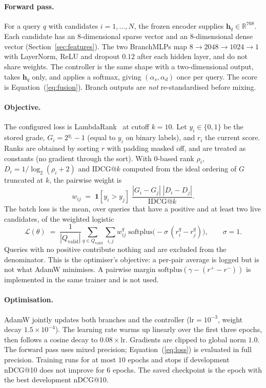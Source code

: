\paragraph{Forward pass.}
For a query $q$ with candidates $i=1,\ldots,N$, the frozen encoder supplies
$\mathbf{h}_q\in\mathbb{R}^{768}$. Each candidate has an $8$-dimensional sparse
vector and an $8$-dimensional dense vector (Section~\ref{sec:features}). The
two BranchMLPs map $8\to 2048\to 1024\to 1$ with LayerNorm, ReLU and dropout
$0.12$ after each hidden layer, and do not share weights. The controller is
the same shape with a two-dimensional output, takes $\mathbf{h}_q$ only, and
applies a softmax, giving $(\alpha_s,\alpha_d)$ once per query. The score is
Equation~(\ref{eq:fusion}). Branch outputs are \emph{not} re-standardised
before mixing.

\paragraph{Objective.}
The configured loss is LambdaRank~\cite{burges2010ranknet} at cutoff
$k{=}10$. Let $y_i\in\{0,1\}$ be the stored grade, $G_i=2^{y_i}-1$ (equal to
$y_i$ on binary labels), and $r_i$ the current score. Ranks are obtained by
sorting $r$ with padding masked off, and are treated as constants
(no gradient through the sort). With $0$-based rank $\rho_i$,
$D_i=1/\log_2(\rho_i+2)$ and $\mathrm{IDCG}@k$ computed from the ideal
ordering of $G$ truncated at $k$, the pairwise weight is
%
\begin{equation}
  w_{ij}
  \;=\;
  \mathbf{1}[y_i > y_j]\;
  \frac{|G_i-G_j|\;|D_i-D_j|}{\mathrm{IDCG}@k}.
  \label{eq:lambdarank-w}
\end{equation}
%
The batch loss is the mean, over queries that have a positive and at least two
live candidates, of the weighted logistic
%
\begin{equation}
  \mathcal{L}(\theta)
  \;=\;
  \frac{1}{|Q_{\mathrm{valid}}|}
  \sum_{q\in Q_{\mathrm{valid}}}
  \sum_{i,j}
  w_{ij}^{q}\;
  \mathrm{softplus}\!\big(-\sigma\,(r_i^{q}-r_j^{q})\big),
  \qquad \sigma = 1.
  \label{eq:loss}
\end{equation}
%
Queries with no positive contribute nothing and are excluded from the
denominator. This is the optimiser's objective: a per-pair average is logged
but is not what AdamW minimises. A pairwise margin
$\mathrm{softplus}(\gamma-(r^+-r^-))$ is implemented in the same trainer and
is not used.

\paragraph{Optimisation.}
AdamW jointly updates both branches and the controller
($\mathrm{lr}=10^{-3}$, weight decay $1.5\times10^{-4}$). The learning rate
warms up linearly over the first three epochs, then follows a cosine decay to
$0.08\times\mathrm{lr}$. Gradients are clipped to global norm $1.0$. The
forward pass uses mixed precision; Equation~(\ref{eq:loss}) is evaluated in
full precision. Training runs for at most $10$ epochs and stops if development
nDCG@10 does not improve for $6$ epochs. The saved checkpoint is the epoch
with the best development nDCG@10.

